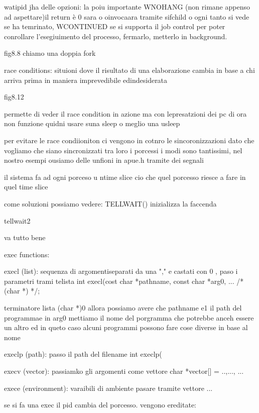  watipid jha delle opzioni: la poiu importante WNOHANG (non rimane appenso ad aspettare)il return è 0 sara o oinvocaara tramite sifchild o ogni tanto si vede se ha temrinato, WCONTINUED se si supporta il job control per poter conrollare l'esegiuimento del processo, fermarlo, metterlo in background.


fig8.8 chiamo una doppia fork





race conditions:
situioni dove il risultato di una elaborazione cambia in base a chi arriva prima in maniera imprevedibile edindesiderata

fig8.12

permette di veder il race condition in azione ma con lepresatzioni dei pc di ora non funzione quidni usare suna sleep o meglio una usleep

per evitare le race condiioniton ci vengono in cotnro le sincoronizzazioni dato che vogliamo che siano sincronizzati tra loro i porcessi
i modi sono tantissimi, nel nostro esempi ousiamo delle unfioni in apue.h tramite dei segnali 


il sistema fa ad ogni porceso u ntime slice cio che quel porcesso riesce a fare in quel time slice 

come soluzioni possiamo vedere:
TELLWAIT() inizializza la faccenda


tellwait2

va tutto bene






exec functions:

execl (list): sequenza di argomentiseparati da una "," e castati con 0 , paso i parametri trami telista
int execl(cost char *pathname, const char *arg0, ... /* (char *) */;

terminatore lista (char *)0
allora possiamo avere che pathname e1 il path del programmae in arg0 mettiamo il nome del porgramma che potrebbe anceh essere un altro ed in queto caso alcuni programmi possono fare cose diverse in base al nome

execlp (path): passo il path del filename
int execlp(

execv (vector): passiamko gli argomenti come vettore
char *vector[] = {..,...,}
...

exece (environment): varaibili di ambiente pasare tramite vettore
...


se si fa una exec il pid cambia del porcesso. vengono ereditate:

